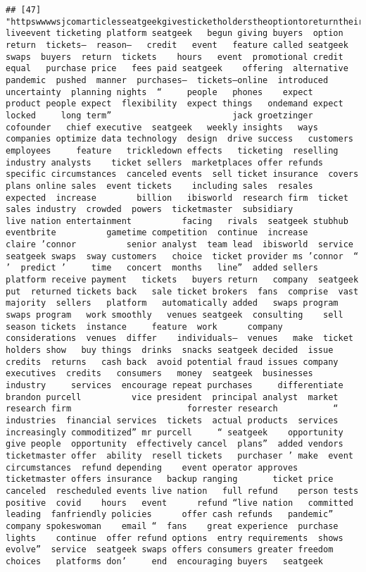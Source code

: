 \documentclass[
]{article}
\begin{document}
\begin{verbatim}
## [47] "httpswwwwsjcomarticlesseatgeekgivesticketholderstheoptiontoreturntheirticketsforacredit liveevent ticketing platform seatgeek   begun giving buyers  option  return  tickets—  reason—   credit   event   feature called seatgeek swaps  buyers  return  tickets    hours   event  promotional credit equal   purchase price   fees paid seatgeek    offering  alternative   pandemic  pushed  manner  purchases—  tickets—online  introduced  uncertainty  planning nights  “     people   phones    expect   product people expect  flexibility  expect things   ondemand expect    locked     long term”                        jack groetzinger           cofounder   chief executive  seatgeek   weekly insights   ways companies optimize data technology  design  drive success   customers  employees     feature   trickledown effects   ticketing  reselling industry analysts    ticket sellers  marketplaces offer refunds   specific circumstances  canceled events  sell ticket insurance  covers    plans online sales  event tickets    including sales  resales  expected  increase        billion   ibisworld  research firm  ticket sales industry  crowded  powers  ticketmaster  subsidiary                        live nation entertainment          facing   rivals  seatgeek stubhub                       eventbrite          gametime competition  continue  increase                        claire ’connor          senior analyst  team lead  ibisworld  service  seatgeek swaps  sway customers   choice  ticket provider ms ’connor  “ ’  predict ’     time   concert  months   line”  added sellers   platform receive payment   tickets   buyers return   company  seatgeek  put  returned tickets back   sale ticket brokers  fans  comprise  vast majority  sellers   platform   automatically added   swaps program   swaps program   work smoothly   venues seatgeek  consulting    sell season tickets  instance     feature  work      company   considerations  venues  differ    individuals—  venues   make  ticket holders show   buy things  drinks  snacks seatgeek decided  issue credits  returns   cash back  avoid potential fraud issues company executives  credits   consumers   money  seatgeek  businesses   industry     services  encourage repeat purchases     differentiate                            brandon purcell          vice president  principal analyst  market research firm                       forrester research           “  industries  financial services  tickets  actual products  services   increasingly commoditized” mr purcell     “ seatgeek    opportunity     give people  opportunity  effectively cancel  plans”  added vendors  ticketmaster offer  ability  resell tickets   purchaser ’ make  event    circumstances  refund depending    event operator approves ticketmaster offers insurance   backup ranging       ticket price  canceled  rescheduled events live nation   full refund    person tests positive  covid    hours   event      refund “live nation   committed  leading  fanfriendly policies      offer cash refunds   pandemic”  company spokeswoman    email “  fans    great experience  purchase  lights    continue  offer refund options  entry requirements  shows evolve”  service  seatgeek swaps offers consumers greater freedom   choices   platforms don’     end  encouraging buyers   seatgeek                
\end{verbatim}
\end{document}
